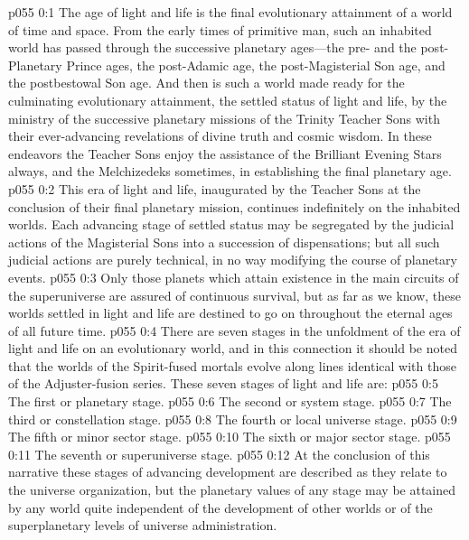 \author{Mighty Messenger}
\vs p055 0:1 The age of light and life is the final evolutionary attainment of a world of time and space. From the early times of primitive man, such an inhabited world has passed through the successive planetary ages---the pre\hyp{} and the post\hyp{}Planetary Prince ages, the post\hyp{}Adamic age, the post\hyp{}Magisterial Son age, and the postbestowal Son age. And then is such a world made ready for the culminating evolutionary attainment, the settled status of light and life, by the ministry of the successive planetary missions of the Trinity Teacher Sons with their ever\hyp{}advancing revelations of divine truth and cosmic wisdom. In these endeavors the Teacher Sons enjoy the assistance of the Brilliant Evening Stars always, and the Melchizedeks sometimes, in establishing the final planetary age.
\vs p055 0:2 This era of light and life, inaugurated by the Teacher Sons at the conclusion of their final planetary mission, continues indefinitely on the inhabited worlds. Each advancing stage of settled status may be segregated by the judicial actions of the Magisterial Sons into a succession of dispensations; but all such judicial actions are purely technical, in no way modifying the course of planetary events.
\pc \vs p055 0:3 Only those planets which attain existence in the main circuits of the superuniverse are assured of continuous survival, but as far as we know, these worlds settled in light and life are destined to go on throughout the eternal ages of all future time.
\pc \vs p055 0:4 There are seven stages in the unfoldment of the era of light and life on an evolutionary world, and in this connection it should be noted that the worlds of the Spirit\hyp{}fused mortals evolve along lines identical with those of the Adjuster\hyp{}fusion series. These seven stages of light and life are:
\pc \vs p055 0:5 \bibnobreakspace The first or planetary stage.
\vs p055 0:6 \bibnobreakspace The second or system stage.
\vs p055 0:7 \bibnobreakspace The third or constellation stage.
\vs p055 0:8 \bibnobreakspace The fourth or local universe stage.
\vs p055 0:9 \bibnobreakspace The fifth or minor sector stage.
\vs p055 0:10 \bibnobreakspace The sixth or major sector stage.
\vs p055 0:11 \bibnobreakspace The seventh or superuniverse stage.
\pc \vs p055 0:12 At the conclusion of this narrative these stages of advancing development are described as they relate to the universe organization, but the planetary values of any stage may be attained by any world quite independent of the development of other worlds or of the superplanetary levels of universe administration.
